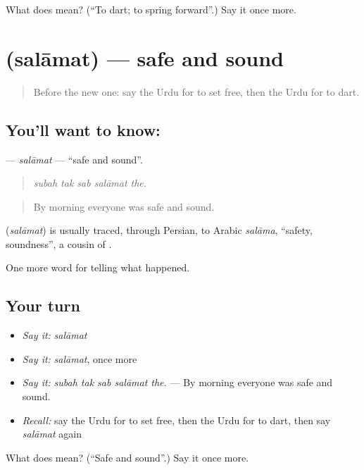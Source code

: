\begin{tcolorbox}[breakable,colback=teal!4,colframe=teal!35!black,title={Before you move on}]
What does  mean? (\textquotedblleft{}To dart; to spring forward\textquotedblright{}.) Say it once more.
\end{tcolorbox}
\section[\texorpdfstring{\ur{سلامت} (salāmat)}{سلامت (salāmat)}]{ (salāmat) — safe and sound}

\label{lesson:UR-C296-salamat}



\begin{quote}
Before the new one: say the Urdu for to set free, then the Urdu for to dart.
\end{quote}

\subsection*{You'll want to know: }
\textbf{} — \emph{salāmat} — \textquotedblleft{}safe and sound\textquotedblright{}.

\begin{quote}
    
\end{quote}

\begin{quote}
\emph{subah tak sab salāmat the.}
\end{quote}

\begin{quote}
By morning everyone was safe and sound.
\end{quote}

\begin{cousinweb}
\textbf{} (\emph{salāmat}) is usually traced, through Persian, to Arabic \emph{salāma}, \textquotedblleft{}safety, soundness\textquotedblright{}, a cousin of \textbf{}.
\end{cousinweb}

\begin{grammarlens}[title={What you've built}]
One more word for telling what happened.
\end{grammarlens}

\subsection*{Your turn}
\begin{itemize}
\raggedright
  \item \emph{Say it:} \emph{salāmat}
  \item \emph{Say it:} \emph{salāmat}, once more
  \item \emph{Say it:} \emph{subah tak sab salāmat the.} — By morning everyone was safe and sound.
  \item \emph{Recall:} say the Urdu for to set free, then the Urdu for to dart, then say \emph{salāmat} again
\end{itemize}

\begin{tcolorbox}[breakable,colback=teal!4,colframe=teal!35!black,title={Before you move on}]
What does  mean? (\textquotedblleft{}Safe and sound\textquotedblright{}.) Say it once more.
\end{tcolorbox}
